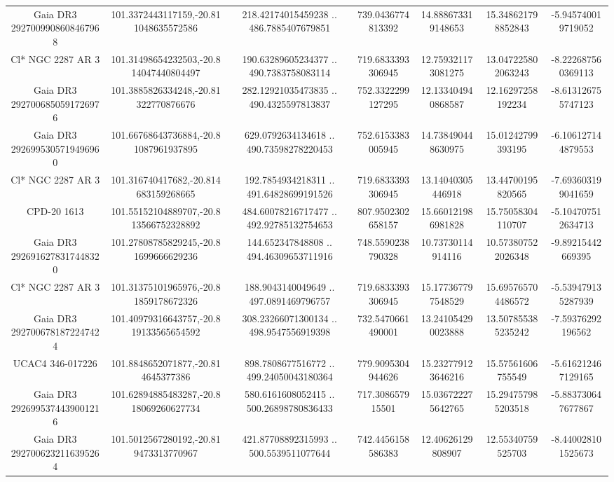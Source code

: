 \begin{table}
\begin{tabular}{ccccccc}
Gaia DR3 2927009908608467968 & 101.3372443117159,-20.811048635572586 & 218.42174015459238 .. 486.7885407679851 & 739.0436774813392 & 14.888673319148653 & 15.348621798852843 & -5.945740019719052 \\
Cl* NGC 2287     AR       3 & 101.31498654232503,-20.814047440804497 & 190.63289605234377 .. 490.7383758083114 & 719.6833393306945 & 12.759321173081275 & 13.047225802063243 & -8.222687560369113 \\
Gaia DR3 2927006850591726976 & 101.3885826334248,-20.81322770876676 & 282.12921035473835 .. 490.4325597813837 & 752.3322299127295 & 12.133404940868587 & 12.16297258192234 & -8.613126755747123 \\
Gaia DR3 2926995305719496960 & 101.66768643736884,-20.81087961937895 & 629.0792634134618 .. 490.73598278220453 & 752.6153383005945 & 14.738490448630975 & 15.01242799393195 & -6.106127144879553 \\
Cl* NGC 2287     AR       3 & 101.316740417682,-20.814683159268665 & 192.7854934218311 .. 491.64828699191526 & 719.6833393306945 & 13.14040305446918 & 13.44700195820565 & -7.693603199041659 \\
CPD-20  1613 & 101.55152104889707,-20.813566752328892 & 484.60078216717477 .. 492.92785132754653 & 807.9502302658157 & 15.660121986981828 & 15.75058304110707 & -5.104707512634713 \\
Gaia DR3 2926916278317448320 & 101.27808785829245,-20.81699666629236 & 144.652347848808 .. 494.46309653711916 & 748.5590238790328 & 10.73730114914116 & 10.573807522026348 & -9.89215442669395 \\
Cl* NGC 2287     AR       3 & 101.31375101965976,-20.81859178672326 & 188.9043140049649 .. 497.0891469796757 & 719.6833393306945 & 15.177367797548529 & 15.695765704486572 & -5.539479135287939 \\
Gaia DR3 2927006781872247424 & 101.40979316643757,-20.819133565654592 & 308.23266071300134 .. 498.9547556919398 & 732.5470661490001 & 13.241054290023888 & 13.507855385235242 & -7.59376292196562 \\
UCAC4 346-017226 & 101.8848652071877,-20.814645377386 & 898.7808677516772 .. 499.24050043180364 & 779.9095304944626 & 15.232779123646216 & 15.57561606755549 & -5.616212467129165 \\
Gaia DR3 2926995374439001216 & 101.62894885483287,-20.818069260627734 & 580.6161608052415 .. 500.26898780836433 & 717.308657915501 & 15.036722275642765 & 15.294757985203518 & -5.883730647677867 \\
Gaia DR3 2927006232116395264 & 101.5012567280192,-20.819473313770967 & 421.87708892315993 .. 500.5539511077644 & 742.4456158586383 & 12.40626129808907 & 12.55340759525703 & -8.440028101525673 \\

\end{tabular}
\end{table}

